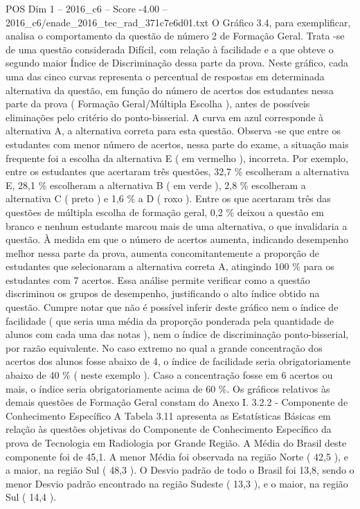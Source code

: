 \begin{textsample}{POS Dim 1 – 2016\_c6 – Score -4.00 – 2016\_c6/enade\_2016\_tec\_rad\_371c7e6d01.txt}
O Gráfico 3.4, para exemplificar, analisa o comportamento da questão de número 2 de Formação Geral.
Trata -se de uma questão considerada Difícil, com relação à facilidade e a que obteve o segundo maior Índice de Discriminação dessa parte da prova.
Neste gráfico, cada uma das cinco curvas representa o percentual de respostas em determinada alternativa da questão, em função do número de acertos dos estudantes nessa parte da prova ( Formação Geral/Múltipla Escolha ), antes de possíveis eliminações pelo critério do ponto-bisserial.
A curva em azul corresponde à alternativa A, a alternativa correta para esta questão.
Observa -se que entre os estudantes com menor número de acertos, nessa parte do exame, a situação mais frequente foi a escolha da alternativa E ( em vermelho ), incorreta.
Por exemplo, entre os estudantes que acertaram três questões, 32,7 \% escolheram a alternativa E, 28,1 \% escolheram a alternativa B ( em verde ), 2,8 \% escolheram a alternativa C ( preto ) e 1,6 \% a D ( roxo ).
Entre os que acertaram três das questões de múltipla escolha de formação geral, 0,2 \% deixou a questão em branco e nenhum estudante marcou mais de uma alternativa, o que invalidaria a questão.
À medida em que o número de acertos aumenta, indicando desempenho melhor nessa parte da prova, aumenta concomitantemente a proporção de estudantes que selecionaram a alternativa correta A, atingindo 100 \% para os estudantes com 7 acertos.
Essa análise permite verificar como a questão discriminou os grupos de desempenho, justificando o alto índice obtido na questão.
Cumpre notar que não é possível inferir deste gráfico nem o índice de facilidade ( que seria uma média da proporção ponderada pela quantidade de alunos com cada uma das notas ), nem o índice de discriminação ponto-bisserial, por razão equivalente.
No caso extremo no qual a grande concentração dos acertos dos alunos fosse abaixo de 4, o índice de facilidade seria obrigatoriamente abaixo de 40 \% ( neste exemplo ).
Caso a concentração fosse em 6 acertos ou mais, o índice seria obrigatoriamente acima de 60 \%.
Os gráficos relativos às demais questões de Formação Geral constam do Anexo I. 3.2.2 - Componente de Conhecimento Específico A Tabela 3.11 apresenta as Estatísticas Básicas em relação às questões objetivas do Componente de Conhecimento Específico da prova de Tecnologia em Radiologia por Grande Região.
A Média do Brasil deste componente foi de 45,1.
A menor Média foi observada na região Norte ( 42,5 ), e a maior, na região Sul ( 48,3 ).
O Desvio padrão de todo o Brasil foi 13,8, sendo o menor Desvio padrão encontrado na região Sudeste ( 13,3 ), e o maior, na região Sul ( 14,4 ).

\end{textsample}
